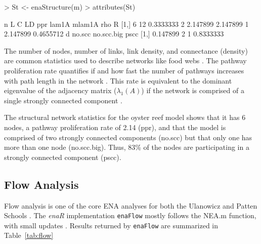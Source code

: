\documentclass[article]{jss}
\begin{document}
\begin{Schunk}
\begin{Sinput}
> St <- enaStructure(m)
> attributes(St)
\end{Sinput}
\begin{Soutput}
     n  L         C LD      ppr    lam1A mlam1A      rho         R
[1,] 6 12 0.3333333  2 2.147899 2.147899      1 2.147899 0.4655712
            d no.scc no.scc.big      pscc
[1,] 0.147899      2          1 0.8333333
\end{Soutput}
\end{Schunk}


The number of nodes, number of links, link density, and connectance
(density) are common statistics used to describe networks like food
webs \citep{martinez1992constant, dunne02food, eklof2006, estrada2007,
  brandes05}.  The pathway proliferation rate quantifies if and how
fast the number of pathways increases with path length in the network
\citep{borrett03, borrett07_jtb}.  This rate is equivalent to the
dominant eigenvalue of the adjacency matrix ($\lambda_1(A)$) if the
network is comprised of a single strongly connected component
\citep{borrett07_jtb}.

The structural network statistics for the oyster reef model shows that
it has 6 nodes, a pathway proliferation rate of 2.14 (ppr), and that
the model is comprised of two strongly connected components (no.scc)
but that only one has more than one node (no.scc.big).  Thus, 83\% of
the nodes are participating in a strongly connected component (pscc).


\subsection{Flow Analysis}

Flow analysis is one of the core ENA analyses
for both the Ulanowicz and Patten Schools \citep{fath99_review,
  latham2006, fath06, schramski11}.  The \textit{enaR} implementation
\texttt{enaFlow} mostly follows the NEA.m function, with small updates
\cite[e.g. calculating the ratio of indirect-to-direct
flows][]{borrett11_ree,borrett11_equ}. Results returned by
\texttt{enaFlow} are summarized in Table~\ref{tab:flow}
\end{document}
